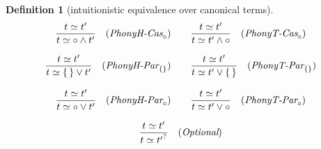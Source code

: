\documentclass[12pt]{article}
\newtheorem{Definition}{Definition}[section]
\begin{document}
\begin{Definition}[intuitionistic equivalence over canonical terms]
\begin{displaymath}
\begin{array}{c}
      \begin{array}{ll}
        \begin{array}{rl}
          \dfrac{ t \simeq t' }{
            t \simeq \circ \wedge t'
          }  &  (\text{\it PhonyH-Cas}_\circ)
        \end{array}
        & \begin{array}{rl}
            \dfrac{ t \simeq t' }{
              t \simeq t' \wedge \circ
            }  &  (\text{\it PhonyT-Cas}_\circ)
          \end{array}
      \end{array}  \\
      \\
            
      \begin{array}{ll}
        \begin{array}{rl}
          \dfrac{ t \simeq t' }{
            t \simeq \{\,\} \vee t'
          }  &  (\text{\it PhonyH-Par}_{\{\}})
        \end{array}
        & \begin{array}{rl}
            \dfrac{ t \simeq t' }{
              t \simeq t' \vee \{\,\}
            }  &  (\text{\it PhonyT-Par}_{\{\}})
          \end{array}
      \end{array}  \\
      \\

      \begin{array}{ll}
        \begin{array}{rl}
          \dfrac{ t \simeq t' }{
            t \simeq \circ \vee t'
          }  &  (\text{\it PhonyH-Par}_\circ)
        \end{array}
        & \begin{array}{rl}
            \dfrac{ t \simeq t' }{
              t \simeq t' \vee \circ
            }  &  (\text{\it PhonyT-Par}_\circ)
          \end{array}
      \end{array}  \\
      \\
      
      \begin{array}{rll}
        \begin{array}{rl}
          \dfrac{
            t \simeq t'
          }{
            t \simeq {t'}^?
          }  &  (\text{\it Optional})
        \end{array}


\end{array}
\end{array}
\end{displaymath}
\end{Definition}
\end{document}
